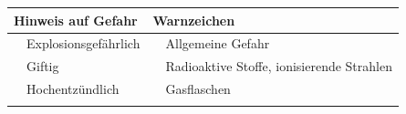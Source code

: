 \documentclass{article}
\begin{document}
\begin{center}
\begin{tabular}{|m{3.225cm}m{3.225cm}|m{3.225cm}m{3.225cm}|}
\hline
\multicolumn{2}{|m{6.65cm}|}{\centering Hinweis auf Gefahr\par

} &
\multicolumn{2}{m{6.65cm}|}{\centering Warnzeichen\par

}\\\hline
\centering   [Warning: Image ignored]
 \par

 &
Explosionsgef\"ahrlich

 &
\centering   [Warning: Image ignored]
 \par

 &
Allgemeine Gefahr

\\\hline
\centering   [Warning: Image ignored]
 \par

 &
Giftig

 &
\centering   [Warning: Image ignored]
 \par

 &
Radioaktive Stoffe, ionisierende Strahlen

\\\hline
\centering   [Warning: Image ignored]
 \par

 &
Hochentz\"undlich

 &
\centering   [Warning: Image ignored]
 \par

 &
Gasflaschen

\\\hline
\centering   [Warning: Image ignored]
 \par


\end{tabular}
\end{center}
\end{document}

